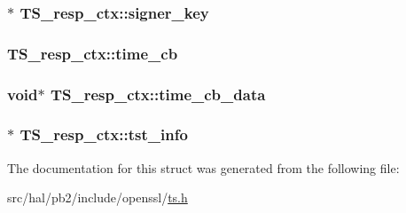 \subsubsection[{\texorpdfstring{signer\+\_\+key}{signer_key}}]{$\ast$ T\+S\+\_\+resp\+\_\+ctx\+::signer\+\_\+key}\hypertarget{struct_t_s__resp__ctx_a0de99406a94785a97ea96c138f8fdadf}{}\label{struct_t_s__resp__ctx_a0de99406a94785a97ea96c138f8fdadf}
\subsubsection[{\texorpdfstring{time\+\_\+cb}{time_cb}}]{ T\+S\+\_\+resp\+\_\+ctx\+::time\+\_\+cb}\hypertarget{struct_t_s__resp__ctx_a838a0b82016f7bcf6aabe4102f1a4ac8}{}\label{struct_t_s__resp__ctx_a838a0b82016f7bcf6aabe4102f1a4ac8}
\subsubsection[{\texorpdfstring{time\+\_\+cb\+\_\+data}{time_cb_data}}]{\setlength{\rightskip}{0pt plus 5cm}void$\ast$ T\+S\+\_\+resp\+\_\+ctx\+::time\+\_\+cb\+\_\+data}\hypertarget{struct_t_s__resp__ctx_aa818a3e3400ed231cf9b6fb084fe5cd6}{}\label{struct_t_s__resp__ctx_aa818a3e3400ed231cf9b6fb084fe5cd6}
\subsubsection[{\texorpdfstring{tst\+\_\+info}{tst_info}}]{$\ast$ T\+S\+\_\+resp\+\_\+ctx\+::tst\+\_\+info}\hypertarget{struct_t_s__resp__ctx_a314c23ef39b07c6119b982b9677c844e}{}\label{struct_t_s__resp__ctx_a314c23ef39b07c6119b982b9677c844e}


The documentation for this struct was generated from the following file\+:\begin{DoxyCompactItemize}
\item 
src/hal/pb2/include/openssl/\hyperlink{ts_8h}{ts.\+h}\end{DoxyCompactItemize}
